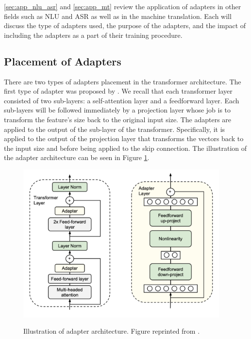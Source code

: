 \cref{sec:app_nlu_asr} and \cref{sec:app_mt} review the application of adapters in other fields such as NLU and ASR as well as in the machine translation. Each will discuss the type of adapters used, the purpose of the adapters, and the impact of including the adapters as a part of their training procedure.

\subsection{Placement of Adapters}
\label{sec:adapter_place}
There are two types of adapters placement in the transformer architecture. The first type of adapter was proposed by \cite{houlsby2019parameter}. We recall that each transformer layer consisted of two sub-layers: a self-attention layer and a feedforward layer. Each sub-layers will be followed immediately by a projection layer whose job is to transform the feature's size back to the original input size. The adapters are applied to the output of the sub-layer of the transformer. Specifically, it is applied to the output of the projection layer that transforms the vectors back to the input size and before being applied to the skip connection. The illustration of the adapter architecture can be seen in Figure \ref{img:ada_houlsby}.

\begin{figure}[h]
    {\includegraphics[width=0.95\textwidth]{img/adapter_houlsby.png}}
    \centering
    \caption{Illustration of adapter architecture. Figure reprinted from \cite{houlsby2019parameter}.}
    \label{img:ada_houlsby}
\end{figure}

